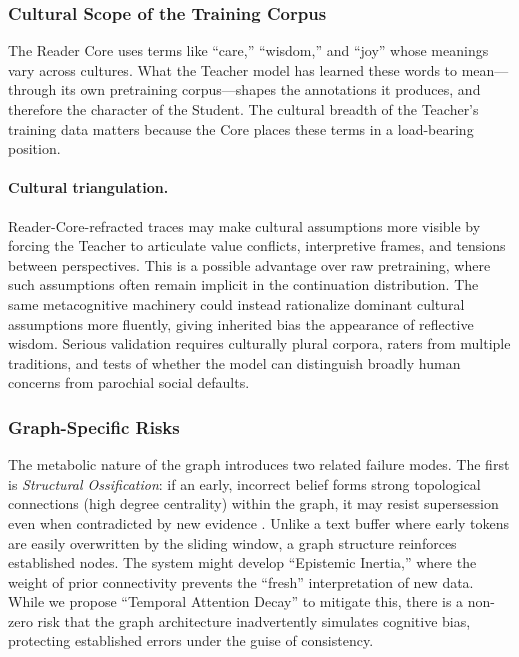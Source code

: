 \subsubsection{Cultural Scope of the Training Corpus}\label{sec:weird-wisdom}

The Reader Core uses terms like ``care,'' ``wisdom,'' and ``joy'' whose meanings vary across cultures. What the Teacher model has learned these words to mean---through its own pretraining corpus---shapes the annotations it produces, and therefore the character of the Student. The cultural breadth of the Teacher's training data matters because the Core places these terms in a load-bearing position.

\paragraph{Cultural triangulation.} Reader-Core-refracted traces may make cultural assumptions more visible by forcing the Teacher to articulate value conflicts, interpretive frames, and tensions between perspectives. This is a possible advantage over raw pretraining, where such assumptions often remain implicit in the continuation distribution. The same metacognitive machinery could instead rationalize dominant cultural assumptions more fluently, giving inherited bias the appearance of reflective wisdom. Serious validation requires culturally plural corpora, raters from multiple traditions, and tests of whether the model can distinguish broadly human concerns from parochial social defaults.

\subsubsection{Graph-Specific Risks}

The metabolic nature of the graph introduces two related failure modes. The first is \emph{Structural Ossification}: if an early, incorrect belief forms strong topological connections (high degree centrality) within the graph, it may resist supersession even when contradicted by new evidence \cite{westerberg2026understanding}. Unlike a text buffer where early tokens are easily overwritten by the sliding window, a graph structure reinforces established nodes. The system might develop ``Epistemic Inertia,'' where the weight of prior connectivity prevents the ``fresh'' interpretation of new data. While we propose ``Temporal Attention Decay'' to mitigate this, there is a non-zero risk that the graph architecture inadvertently simulates cognitive bias, protecting established errors under the guise of consistency.


